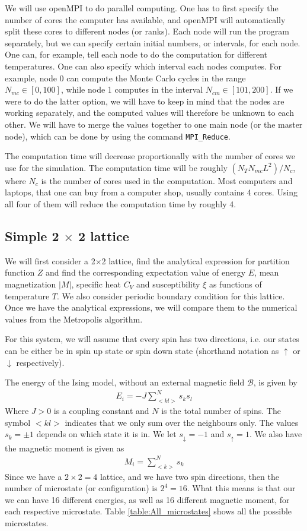 \documentclass[12pt]{article}
\begin{document}
We will use openMPI to do parallel computing. One has to first specify the number of cores the computer has available, and openMPI will automatically split these cores to different nodes (or ranks). Each node will run the program separately, but we can specify certain initial numbers, or intervals, for each node. One can, for example, tell each node to do the computation for different temperatures. One can also specify which interval each nodes computes. For example, node 0 can compute the Monte Carlo cycles in the range $N_{mc} \in [0,100]$, while node 1 computes in the interval $N_{cm} \in [101, 200]$. If we were to do the latter option, we will have to keep in mind that the nodes are working separately, and the computed values will therefore be unknown to each other. We will have to merge the values together to one main node (or the master node), which can be done by using the command \texttt{MPI\_Reduce}.

The computation time will decrease proportionally with the number of cores we use for the simulation. The computation time will be roughly $(N_TN_{mc}L^2)/N_{c}$, where $N_{c}$ is the number of cores used in the computation. Most computers and laptops, that one can buy from a computer shop, usually contains 4 cores. Using all four of them will reduce the computation time by roughly 4.
\subsection{Simple 2 $\times$ 2 lattice}
We will first consider a 2$\times$2 lattice, find the analytical expression for partition function $Z$ and find the corresponding expectation value of energy $E$, mean magnetization $|M|$, specific heat $C_V$ and susceptibility $\xi$ as functions of temperature $T$. We also consider periodic boundary condition for this lattice. Once we have the analytical expressions, we will compare them to the numerical values from the Metropolis algorithm.

For this system, we will assume that every spin has two directions, i.e. our states can be either be in spin up state or spin down state (shorthand notation as $\uparrow$ or $\downarrow$ respectively).

The energy of the Ising model, without an external magnetic field $\mathcal{B}$, is given by
\begin{align*}
E_i = \displaystyle -J \sum_{<kl>}^Ns_k s_l
\end{align*} 
Where $J > 0$ is a coupling constant and $N$ is the total number of spins. The symbol $<kl>$ indicates that we only sum over the neighbours only. The values $s_k = \pm 1$ depends on which state it is in. We let $s_{\downarrow} = -1$ and $s_{\uparrow} = 1$. We also have the magnetic moment is given as
\begin{align*}
M_i = \displaystyle \sum_{<k>}^N s_k
\end{align*}
Since we have a $2\times2=4$ lattice, and we have two spin directions, then the number of microstate (or configuration) is $2^4 = 16$. What this means is that our we can have 16 different energies, as well as 16 different magnetic moment, for each respective microstate. Table \ref{table:All_microstates} shows all the possible microstates.
\end{document}
